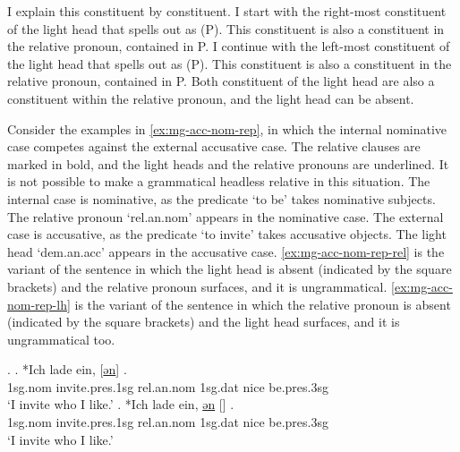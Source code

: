 I explain this constituent by constituent.
I start with the right-most constituent of the light head that spells out as  (P). This constituent is also a constituent in the relative pronoun, contained in P.
I continue with the left-most constituent of the light head that spells out as  (P). This constituent is also a constituent in the relative pronoun, contained in P.
Both constituent of the light head are also a constituent within the relative pronoun, and the light head can be absent.

Consider the examples in \ref{ex:mg-acc-nom-rep}, in which the internal nominative case competes against the external accusative case. The relative clauses are marked in bold, and the light heads and the relative pronouns are underlined. It is not possible to make a grammatical headless relative in this situation.
The internal case is nominative, as the predicate  `to be' takes nominative subjects. The relative pronoun  `\ac{rel}.\ac{an}.\ac{nom}' appears in the nominative case.
The external case is accusative, as the predicate  `to invite' takes accusative objects. The light head  `\ac{dem}.\ac{an}.\ac{acc}' appears in the accusative case.
\ref{ex:mg-acc-nom-rep-rel} is the variant of the sentence in which the light head is absent (indicated by the square brackets) and the relative pronoun surfaces, and it is ungrammatical.
\ref{ex:mg-acc-nom-rep-lh} is the variant of the sentence in which the relative pronoun is absent (indicated by the square brackets) and the light head surfaces, and it is ungrammatical too.

\ex.\label{ex:mg-acc-nom-rep}
\ag. *Ich {lade ein}, [\underline{ən}] \underline{}   .\\
1\ac{sg}.\ac{nom} invite.\ac{pres}.1\ac{sg}\scsub{[acc]} \ac{rel}.\ac{an}.\ac{nom} 1\ac{sg}.\ac{dat} nice be.\ac{pres}.3\ac{sg}\scsub{[nom]}\\
`I invite who I like.' \label{ex:mg-acc-nom-rep-rel}
\bg. *Ich {lade ein}, \underline{ən} [\underline{}]   .\\
1\ac{sg}.\ac{nom} invite.\ac{pres}.1\ac{sg}\scsub{[acc]} \ac{rel}.\ac{an}.\ac{nom} 1\ac{sg}.\ac{dat} nice be.\ac{pres}.3\ac{sg}\scsub{[nom]}\\
`I invite who I like.' \label{ex:mg-acc-nom-rep-lh}


